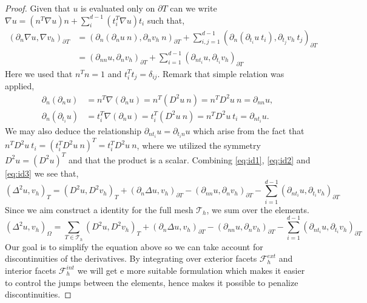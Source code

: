 \begin{proof}
Given that $u$ is evaluated only on $\partial T$ can we write
$\nabla u = \left( n^{T} \nabla u   \right) n + \sum_i^{d-1} \left( t_i^{T} \nabla u   \right) t_i$ such that,
\begin{equation}
\label{eq:id3}
    \begin{split}
(  \partial_n\nabla u, \nabla v_h ) _{\partial_{} T  } & =  ( \partial _{n} ( \partial_{n}u \ n), \partial _{n} v_h \ n )_{\partial T}   +\sum_{i,j=1}^{d-1} ( \partial _{n} ( \partial_{t_{i}}u \ t_{i}), \partial _{t_{j}} v_h \ t_{j} )_{\partial T} \\
& =  ( \partial _{nn} u, \partial _{n} v_h  )_{\partial T}+\sum_{i=1}^{d-1} ( \partial _{n t_{i}}u , \partial _{t_{i}} v_h  )_{\partial T}
    \end{split}
\end{equation}
Here we used that $n^{T} n = 1$ and $t_{i}^{T} t_{j} = \delta_{ij}$.
Remark that simple relation was applied,
    \begin{align*}
\partial_n (\partial_n u)  & = n^T \nabla (\partial_n u)  = n ^T (D^2 u \ n)  = n^{T} D^2 u \ n = \partial _{nn} u, \\
\partial_n (\partial_{t_{i}} u)  & = t_{i}^T \nabla (\partial_n u)  = t_i^T (D^2 u \ n )   = n^{T} D^2 u \ t_{i} = \partial _{n t_{i}} u.
    \end{align*}
We may also deduce the relationship $\partial _{nt_{i}} u = \partial _{t_{i}n}u$ which arise from the fact that $n^{T} D^2u \ t_{i} = ( t_{i}^{T} D^2u \  n)^T = t_{i}^{T}  D^2u \  n$, where we utilized the symmetry $D^2u = ( D^2u) ^{T} $ and that the
product is a scalar.
Combining \eqref{eq:id1}, \eqref{eq:id2} and \eqref{eq:id3} we see that,
\[
    ( \Delta ^2 u, v_h) _{T}   = ( D^2 u, D^2v_h)_{T } + ( \partial _{n}  \Delta u, v_h )_{\partial T} -( \partial _{nn}u , \partial _{n} v_h  )_{\partial T}-\sum_{i=1}^{d-1} ( \partial _{n t_{i}}u, \partial _{t_{i}} v_h  )_{\partial T}
\]
Since we aim construct a identity for the full mesh $\mathcal{T} _{h}$, we sum over the elements.
\begin{equation}
\label{eq:bi_basic_dg2}
\left( \Delta  ^{2} u,v_h \right) _{\Omega } = \sum_{T \in  \mathcal{T} _{h}}^{}  ( D^2 u, D^2v_h)_{T } + ( \partial _{n}  \Delta u, v_h )_{\partial T} -( \partial _{nn}u , \partial _{n} v_h  )_{\partial T}-\sum_{i=1}^{d-1} ( \partial _{n t_{i}} u , \partial _{t_{i}} v_h  )_{\partial T}
\end{equation}
Our goal is to simplify the equation above so we can take account for discontinuities of the derivatives.
By integrating over exterior facets $\mathcal{F} _{h}^{ext}$ and interior facets $\mathcal{F} _{h}^{int}$ we will get e more suitable formulation which makes it easier to control the jumps between the elements, hence makes it possible to penalize discontinuities.


\end{proof}
